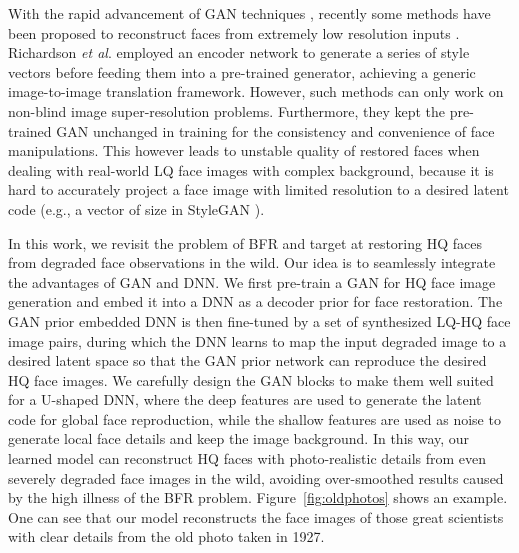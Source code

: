 \documentclass[final]{cvpr}
\begin{document}
With the rapid advancement of GAN techniques \cite{Karras2018StyleGAN,Karras2019StyleGAN2}, recently some methods have been proposed to reconstruct faces from extremely low resolution inputs \cite{Gu2019Prior,Menon2020PULSE,Richardson2020pSp}. Richardson \emph{et al}. \cite{Richardson2020pSp} employed an encoder network to generate a series of style vectors before feeding them into a pre-trained generator, achieving a generic image-to-image translation framework. However, such methods can only work on non-blind image super-resolution problems. Furthermore, they kept the pre-trained GAN unchanged in training for the consistency and convenience of face manipulations. This however leads to unstable quality of restored faces when dealing with real-world LQ face images with complex background, because it is hard to accurately project a face image with limited resolution to a desired latent code (e.g., a vector of size  in StyleGAN \cite{Karras2018StyleGAN,Karras2019StyleGAN2}).

In this work, we revisit the problem of BFR and target at restoring HQ faces from degraded face observations in the wild. Our idea is to seamlessly integrate the advantages of GAN and DNN. We first pre-train a GAN for HQ face image generation and embed it into a DNN as a decoder prior for face restoration. The GAN prior embedded DNN is then fine-tuned by a set of synthesized LQ-HQ face image pairs, during which the DNN learns to map the input degraded image to a desired latent space so that the GAN prior network can reproduce the desired HQ face images. We carefully design the GAN blocks to make them well suited for a U-shaped DNN, where the deep features are used to generate the latent code for global face reproduction, while the shallow features are used as noise to generate local face details and keep the image background. In this way, our learned model can reconstruct HQ faces with photo-realistic details from even severely degraded face images in the wild, avoiding over-smoothed results caused by the high illness of the BFR problem. Figure~\ref{fig:oldphotos} shows an example. One can see that our model reconstructs the face images of those great scientists with clear details from the old photo taken in 1927. 
\end{document}
